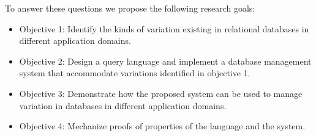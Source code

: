 %
%
%
%
%
%
%
%





To answer these questions we propose the following research goals:

\begin{itemize}
\item Objective 1: Identify the kinds of variation existing in relational databases in 
different application domains.
\item Objective 2: Design a query language and implement a database management 
system that accommodate  variations identified in objective 1.
\item Objective 3: Demonstrate how the proposed system can be used to manage
variation in databases in different application domains.
\item Objective 4: Mechanize proofs of properties of the language and the system.
\end{itemize}

